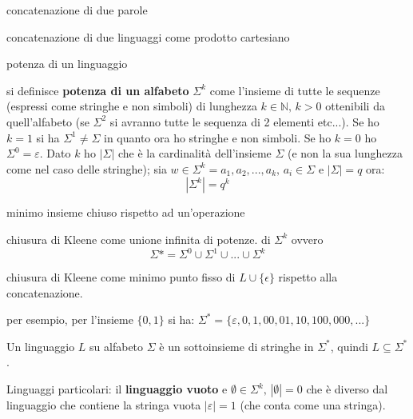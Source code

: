 \begin{definition}\label{def:concatenazione-parole}
concatenazione di due parole
\end{definition}

\begin{definition}\label{def:concatenazione-linguaggi}
concatenazione di due linguaggi come prodotto cartesiano
\end{definition}

potenza di un linguaggio

 si definisce \textbf{potenza di un alfabeto} $\Sigma^k$ come l'insieme di tutte le sequenze (espressi come stringhe e non simboli) di lunghezza $k\in\mathbb{N},\, k>0$ ottenibili da quell'alfabeto (se $\Sigma^2$ si avranno tutte le sequenza di 2 elementi etc...). Se ho $k=1$ si ha $\Sigma^1\neq \Sigma$ in quanto ora ho stringhe e non simboli. Se ho $k=0$ ho $\Sigma^0=\varepsilon$. Dato $k$ ho $|\Sigma|$ che è la cardinalità dell'insieme $\Sigma$ (e non la sua lunghezza come nel caso delle stringhe); sia $w\in\Sigma^k=a_1,a_2,...,a_k,\,a_i\in\Sigma$ e $|\Sigma|=q$ ora: $$|\Sigma^k|=q^k$$

\begin{definition}\label{def:punto-fisso}
minimo insieme chiuso rispetto ad un'operazione
\end{definition}

\begin{definition}\label{def:kleene}
chiusura di Kleene come unione infinita di potenze.
di $\Sigma^k$ ovvero $$\Sigma*=\Sigma^0\cup \Sigma^1\cup...\cup \Sigma^k$$
\end{definition}

\begin{proposition}\label{prop:kleene-punto-fisso}
chiusura di Kleene come minimo punto fisso di $L\cup \{\epsilon\}$ rispetto alla concatenazione.
\end{proposition}

\begin{example}\label{exa:chiusura-kleene}
				per esempio, per l'insieme $\{0,1\}$ si ha:
				$\Sigma^*=\{\varepsilon,0,1,00,01,10,100,000,...\}$
\end{example}

\begin{observation}\label{obs:linguaggio}
Un linguaggio $L$ su alfabeto $\Sigma$ è un sottoinsieme di stringhe in $ \Sigma^*$,
quindi $L\subseteq \Sigma^*$.
\end{observation}

Linguaggi particolari: il \textbf{linguaggio vuoto} e $\emptyset\in\Sigma^k,\,|\emptyset|=0$ che è
diverso dal linguaggio che contiene la stringa vuota $|\varepsilon|=1$ (che conta come una
stringa).


